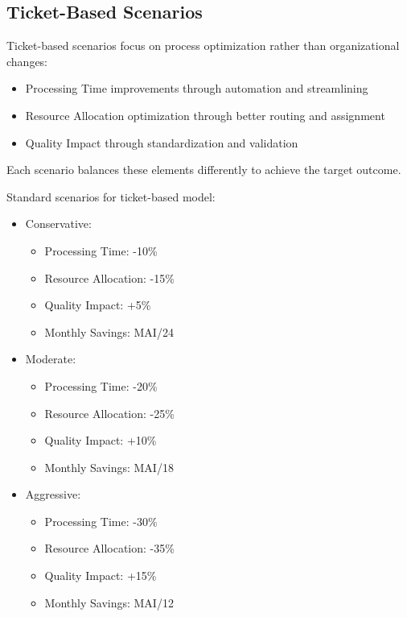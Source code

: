 \documentclass[12pt,a4paper]{article}
\newenvironment{explanation}
{\begin{mdframed}[style=explanationstyle,frametitle={Explanation}]}
{\end{mdframed}}
\newenvironment{observation}
{\begin{mdframed}[style=observationstyle,frametitle={Observation}]}
{\end{mdframed}}
\begin{document}
\subsection{Ticket-Based Scenarios}

\begin{explanation}
Ticket-based scenarios focus on process optimization rather than organizational changes:
\begin{itemize}
    \item Processing Time improvements through automation and streamlining
    \item Resource Allocation optimization through better routing and assignment
    \item Quality Impact through standardization and validation
\end{itemize}
Each scenario balances these elements differently to achieve the target outcome.
\end{explanation}

\begin{observation}
Standard scenarios for ticket-based model:
\begin{itemize}
    \item Conservative:
        \begin{itemize}
            \item Processing Time: -10\%
            \item Resource Allocation: -15\%
            \item Quality Impact: +5\%
            \item Monthly Savings: MAI/24
        \end{itemize}
    \item Moderate:
        \begin{itemize}
            \item Processing Time: -20\%
            \item Resource Allocation: -25\%
            \item Quality Impact: +10\%
            \item Monthly Savings: MAI/18
        \end{itemize}
    \item Aggressive:
        \begin{itemize}
            \item Processing Time: -30\%
            \item Resource Allocation: -35\%
            \item Quality Impact: +15\%
            \item Monthly Savings: MAI/12
        \end{itemize}
\end{itemize}
\end{observation}
\end{document}

